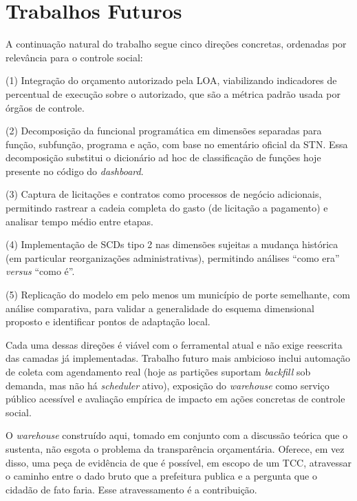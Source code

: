 \section{Trabalhos Futuros}

A continuação natural do trabalho segue cinco direções concretas, ordenadas por relevância para o controle social:

(1) Integração do orçamento autorizado pela LOA, viabilizando indicadores de percentual de execução sobre o autorizado, que são a métrica padrão usada por órgãos de controle.

(2) Decomposição da funcional programática em dimensões separadas para função, subfunção, programa e ação, com base no ementário oficial da STN. Essa decomposição substitui o dicionário ad hoc de classificação de funções hoje presente no código do \textit{dashboard}.

(3) Captura de licitações e contratos como processos de negócio adicionais, permitindo rastrear a cadeia completa do gasto (de licitação a pagamento) e analisar tempo médio entre etapas.

(4) Implementação de SCDs tipo 2 nas dimensões sujeitas a mudança histórica (em particular reorganizações administrativas), permitindo análises ``como era'' \textit{versus} ``como é''.

(5) Replicação do modelo em pelo menos um município de porte semelhante, com análise comparativa, para validar a generalidade do esquema dimensional proposto e identificar pontos de adaptação local.

Cada uma dessas direções é viável com o ferramental atual e não exige reescrita das camadas já implementadas. Trabalho futuro mais ambicioso inclui automação de coleta com agendamento real (hoje as partições suportam \textit{backfill} sob demanda, mas não há \textit{scheduler} ativo), exposição do \textit{warehouse} como serviço público acessível e avaliação empírica de impacto em ações concretas de controle social.

O \textit{warehouse} construído aqui, tomado em conjunto com a discussão teórica que o sustenta, não esgota o problema da transparência orçamentária. Oferece, em vez disso, uma peça de evidência de que é possível, em escopo de um TCC, atravessar o caminho entre o dado bruto que a prefeitura publica e a pergunta que o cidadão de fato faria. Esse atravessamento é a contribuição.
